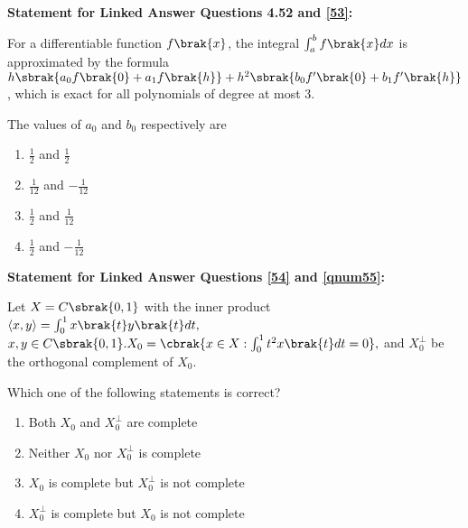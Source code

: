 \iffalse
\chapter{2010}
\author{AI24BTECH11015 - Harshvardhan Patidar}
\section{ma}
\fi

    
    \item[] \textbf{Statement for Linked Answer Questions 4.52 and \ref{53}:}

    For a differentiable function $f\brak{x}$, the integral $\int_{a}^{b} f\brak{x}dx $ is approximated by the formula $h\sbrak{ a_0 f\brak{0} + a_1 f\brak{h}} + h^2 \sbrak{b_0 f^{\prime}\brak{0} + b_1 f^{\prime}\brak{h}}$, which is exact for all polynomials of degree at most $3$.

    \item \label{53}  The values of $a_0$ and $b_0$ respectively are 
        \begin{enumerate}
            \item $\frac{1}{2}$ and $\frac{1}{2}$
            \item $\frac{1}{12}$ and $-\frac{1}{12}$
            \item $\frac{1}{2}$ and $\frac{1}{12}$
            \item $\frac{1}{2}$ and $-\frac{1}{12}$
        \end{enumerate}

    \item[] \textbf{Statement for Linked Answer Questions \ref{54} and \ref{qnum55}:}
    
    Let $X = C\sbrak{0,1}$ with the inner product $\langle x,y \rangle = \int_{0}^{1} x\brak{t} y\brak{t} dt,$ $x,y \in C\sbrak{0,1}. X_0 = \cbrak{ x \in X : 
    \int_0^1 t^2 x \brak{t} dt = 0},$ and $X_0^{\perp}$ be the orthogonal complement of $X_0$.

    \item \label{54} Which one of the following statements is correct?
        \begin{enumerate}
            \item Both $X_0$ and $X_0^{\perp}$ are complete
            \item Neither $X_0$ nor $X_0^{\perp}$ is complete
            \item $X_0$ is complete but $X_0^{\perp}$ is not complete
            \item $X_0^{\perp}$ is complete but $X_0$ is not complete
        \end{enumerate}

